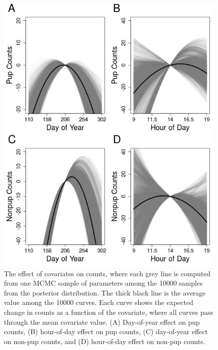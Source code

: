 \documentclass[12pt, titlepage]{article}\usepackage[]{graphicx}\usepackage[]{color}
\begin{document}



\begin{figure}[H]
  \begin{center}
  \includegraphics[width=0.8\linewidth]{figure/plot-covariates-1.jpeg}
  \end{center}
  \caption{The effect of covariates on counts, where each grey line is computed from one MCMC sample of parameters among the 10000 samples from the posterior distribution.  The thick black line is the average value among the 10000 curves. Each curve shows the expected change in counts as a function of the covariate, where all curves pass through the mean covariate value. (A) Day-of-year effect on pup counts, (B) hour-of-day effect on pup counts, (C) day-of-year effect on non-pup counts, and (D) hour-of-day effect on non-pup counts.  \label{plot-covariates}}         
\end{figure}

\end{document}
